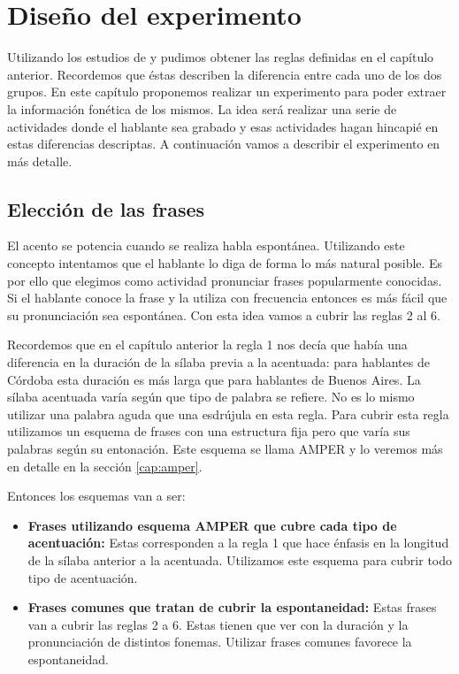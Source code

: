 \chapter{Diseño del experimento}

Utilizando los estudios de \cite{Fontanella2000} y \cite{Vidal1964} pudimos obtener las reglas definidas en el capítulo anterior. Recordemos que éstas describen la diferencia entre cada uno de los dos grupos. En este capítulo proponemos realizar un experimento para poder extraer la información fonética de los mismos. La idea será realizar una serie de actividades donde el hablante sea grabado y esas actividades hagan hincapié en estas diferencias descriptas. A continuación vamos a describir el experimento en más detalle.

\section{Elección de las frases}

El acento se potencia cuando se realiza habla espontánea. Utilizando este concepto intentamos que el hablante lo diga de forma lo más natural posible. Es por ello que elegimos como actividad pronunciar frases popularmente conocidas. Si el hablante conoce la frase y la utiliza con frecuencia entonces es más fácil que su pronunciación sea espontánea. Con esta idea vamos a cubrir las reglas 2 al 6. 

Recordemos que en el capítulo anterior la regla 1 nos decía que había una diferencia en la duración de la sílaba previa a la acentuada: para hablantes de Córdoba esta duración es más larga que para hablantes de Buenos Aires. La sílaba acentuada varía según que tipo de palabra se refiere. No es lo mismo utilizar una palabra aguda que una esdrújula en esta regla. Para cubrir esta regla utilizamos un esquema de frases con una estructura fija pero que varía sus palabras según su entonación. Este esquema se llama AMPER \cite{amper} y lo veremos más en detalle en la sección \ref{cap:amper}.

Entonces los esquemas van a ser: 

\begin{itemize}
  \item \textbf{Frases utilizando esquema AMPER que cubre cada tipo de acentuación:} Estas corresponden a la regla 1 que hace énfasis en la longitud de la sílaba anterior a la acentuada. Utilizamos este esquema para cubrir todo tipo de acentuación.
  \item \textbf{Frases comunes que tratan de cubrir la espontaneidad:} Estas frases van a cubrir las reglas 2 a 6. Estas tienen que ver con la duración y la pronunciación de distintos fonemas. Utilizar frases comunes favorece la espontaneidad.
\end{itemize}

